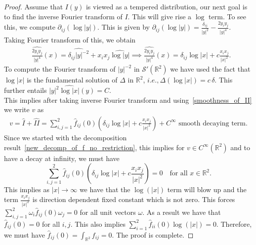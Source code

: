 \documentclass[11pt]{article}
\newcommand{\abs}[1]{\lvert #1 \rvert}
\newcommand{\D}{\mathrm{d}}
\newcommand{\wh}{\widehat}
\newcommand{\PD}{\partial}
\newcommand{\Rb}{\mathbb{R}}
\newcommand*{\Rt}{\mathbb{R}^2}
\newcommand{\sch}{\mathcal{S}}
\newcommand{\qum}[1]{\quad\mbox{#1}}
\newtheorem{remark}[theorem]{Remark}
\newcommand{\ssc}[1]{\begin{quotation}\textbf{\color{blue}Suman's comment:\
		}{\color{blue}\textit{#1}}\end{quotation}}
\newcommand{\antti}[1]{\textcolor{red}{Antti's comment: #1}}
\begin{document}
\begin{proof}
Assume that $I(y)$ is viewed as a tempered distribution, our next goal is to find the inverse Fourier transform of $I$. This will give rise a $\log$  term. To see this, we compute $ \PD_{ij} (\log \abs{y}) $. This is given by $\PD_{ij} (\log \abs{y}) = \frac{\delta_{ij}}{\abs{y}^2}- \frac{2 y_iy_j}{\abs{y}^4}.$
 Taking Fourier transform of this, we obtain 
 \begin{align*}
 &\widehat{\frac{2 y_iy_j}{\abs{y}^4}}(x) = \widehat{\delta_{ij} |y|^{-2}} + x_i x_j \widehat{\log\abs{y}}\implies \widehat{\frac{2 y_iy_j}{\abs{y}^4}}(x) = \delta_{ij} \log\abs{x} +c  \frac{x_i x_j}{\abs{x}^2}.
\end{align*}
To compute the Fourier transform of $\abs{y}^{-2}$ in $\sch'(\Rt)$ we have used the fact that $ \log \abs{x}$ is the fundamental solution of $ \Delta$ in $\mathbb{R}^2$, $i.e., \Delta (\log \abs{x}) = c\, \delta$. This further entails $ \abs{y}^2 \wh{\log|x|}(y)= C.  $
\vspace{2mm}\\
This implies after taking inverse Fourier transform and using~\eqref{smoothness_of_II} we write $v$ as
\begin{align}
    v= \wh{I}+ \wh{II}=  \sum_{i,j=1}^2\wh{f}_{ij}(0) \left( \delta_{ij} \log\abs{x} +c  \frac{x_i x_j}{\abs{x}^2}\right) + \mbox{$C^{\infty}$ smooth  decaying term}.
\end{align}
Since we started with the decomposition result~\eqref{new_decomp_of_f_no_restriction}, this implies for  $v \in C^{\infty}(\Rt) $ and to have a decay at infinity, we must have 
\[  \sum_{i,j=1}^2 \wh{f}_{ij}(0) \left( \delta_{ij} \log\abs{x} +c  \frac{x_i x_j}{\abs{x}^2}\right)=0 \qum{for all $x\in \Rt$}.\]
This implies  as $\abs{x}\rightarrow \infty$ we have that the $\log(\abs{x})$ term will blow up and the term $ \frac{x_i x_j}{\abs{x}^2}$ is direction dependent fixed constant which is not zero. This forces $  \sum_{i,j=1}^2\omega_i  \wh{f}_{ij}(0)  \omega _j=0$ for all unit vectors $\omega$.  As a result we have that $\wh{f}_{ij}(0)=0$ for all $i,j$. This also implies $\sum_{i=1}^2 \wh{f}_{ii}(0)  \log (\abs{x})=0$. Therefore, we must have $ \wh{f}_{ij} (0)=\int_{\Rt} f_{ij} =0$. The proof is complete.
\end{proof}
\end{document}
